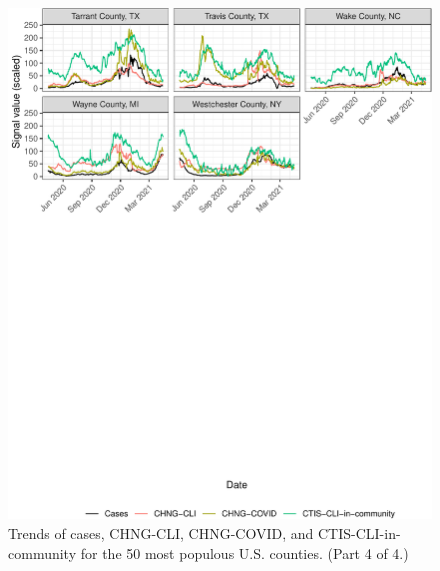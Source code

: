 \begin{figure}

{\centering \includegraphics[width=\textwidth]{fig/county-trend-grids-4-1}

}

\caption{Trends of cases, CHNG-CLI, CHNG-COVID, and CTIS-CLI-in-community for the 50 most populous U.S. counties. (Part 4 of 4.)}\label{fig:county-trend-grids-4}
\end{figure}

\clearpage

